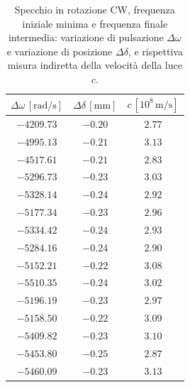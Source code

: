 \documentclass[]{article}
\begin{document}
    \begin{table}
        \centering
        \begin{tabular}{||c|c|c||}
            \hline
            $\Delta \omega \,[\text{rad/s}]$ & $\Delta \delta \,[\text{mm}]$ & $c \,[10^8 \,\text{m/s}]$ \\
            \hline\hline
            $-4209.73$ & $-0.20$ & $2.77$ \\\hline
            $-4995.13$ & $-0.21$ & $3.13$ \\\hline
            $-4517.61$ & $-0.21$ & $2.83$ \\\hline
            $-5296.73$ & $-0.23$ & $3.03$ \\\hline
            $-5328.14$ & $-0.24$ & $2.92$ \\\hline
            $-5177.34$ & $-0.23$ & $2.96$ \\\hline
            $-5334.42$ & $-0.24$ & $2.93$ \\\hline
            $-5284.16$ & $-0.24$ & $2.90$ \\\hline
            $-5152.21$ & $-0.22$ & $3.08$ \\\hline
            $-5510.35$ & $-0.24$ & $3.02$ \\\hline
            $-5196.19$ & $-0.23$ & $2.97$ \\\hline
            $-5158.50$ & $-0.22$ & $3.09$ \\\hline
            $-5409.82$ & $-0.23$ & $3.10$ \\\hline
            $-5453.80$ & $-0.25$ & $2.87$ \\\hline
            $-5460.09$ & $-0.23$ & $3.13$ \\\hline
        \end{tabular}
        \caption{Specchio in rotazione CW, frequenza iniziale minima e frequenza finale intermedia: variazione di pulsazione $\Delta\omega$ e variazione di posizione $\Delta\delta$, e rispettiva misura indiretta della velocità della luce $c$.}
        \label{CW_min_mid-c}
    \end{table}
\end{document}
